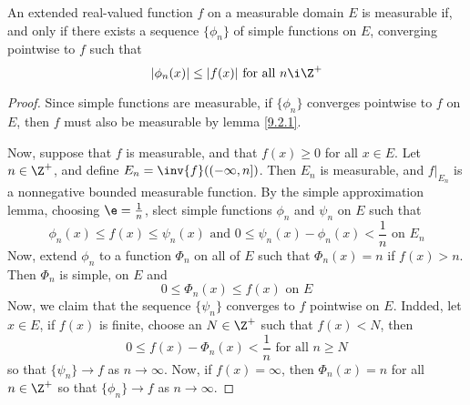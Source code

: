 \begin{theorem}\label{9.2.5}
    An extended real-valued function $f$ on a measurable domain $E$ is measurable
    if, and only if there exists a sequence  $\{\phi_n\}$ of simple functions on
    $E$, converging pointwise to  $f$ such that
    \begin{equation*}
        |\phi_n(x)| \leq |f(x)| \text{ for all } n \i \Z^+
    \end{equation*}
\end{theorem}
\begin{proof}
    Since simple functions are measurable, if $\{\phi_n\}$ converges pointwise
    to $f$ on  $E$, then  $f$ must also be measurable by lemma \ref{9.2.1}.

    Now, suppose that $f$ is measurable, and that  $f(x) \geq 0$ for all $x \in
    E$. Let  $n \in \Z^+$, and define  $E_n=\inv{f}((-\infty,n])$. Then $E_n$ is
    measurable, and  $f|_{E_n}$ is a nonnegative bounded measurable function. By
    the simple approximation lemma, choosing $\e=\frac{1}{n}$, slect simple
    functions $\phi_n$ and  $\psi_n$ on  $E$ such that
    \begin{equation*}
        \phi_n(x) \leq f(x) \leq \psi_n(x) \text{ and }
        0 \leq \psi_n(x)-\phi_n(x)<\frac{1}{n} \text{ on } E_n
    \end{equation*}
    Now, extend $\phi_n$ to a function  $\Phi_n$ on all of  $E$ such that
    $\Phi_n(x)=n$ if $f(x)>n$. Then $\Phi_n$ is simple, on  $E$ and
    \begin{equation*}
        0 \leq \Phi_n(x) \leq f(x) \text{ on } E
    \end{equation*}
    Now, we claim that the sequence $\{\psi_n\}$ converges to $f$ pointwise on
    $E$. Indded, let  $x \in E$, if  $f(x)$ is finite, choose an $N \in \Z^+$
    such that  $f(x)<N$, then
    \begin{equation*}
        0 \leq f(x)-\Phi_n(x)<\frac{1}{n} \text{ for all } n \geq N
    \end{equation*}
    so that $\{\psi_n\} \xrightarrow{} f$ as $n \xrightarrow{} \infty$. Now, if
    $f(x)=\infty$, then $\Phi_n(x)=n$ for all $n \in \Z^+$ so that  $\{\phi_n\}
    \xrightarrow{} f$ as $n \xrightarrow{} \infty$.
\end{proof}

